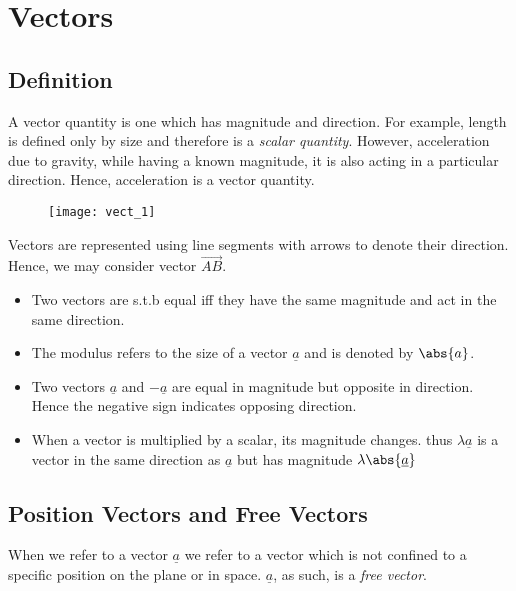 \documentclass{standalone}
\begin{document}
	\chapter{Vectors}
	\section{Definition}
	\quad A vector quantity is one which has magnitude and direction. For example, length is defined only by size and therefore is a \textit{scalar quantity}. However, acceleration due to gravity, while having a known magnitude, it is also acting in a particular direction. Hence, acceleration is a vector quantity.
	
	\begin{wrapfigure}{r}{0.25\textwidth}
		\texttt{[image: vect\_1]} 
	\end{wrapfigure}
	
	Vectors are represented using line segments with arrows to denote their direction. Hence, we may consider vector $\overrightarrow{AB}$.
	
	\begin{itemize}
		\item{Two vectors are s.t.b equal iff they have the same magnitude and act in the same direction.}
		\item{The modulus refers to the size of a vector $\underline{a}$ and is denoted by $\abs{a}$.}
		\item{Two vectors $\underline{a}$ and  $-\underline{a}$  are equal in magnitude but opposite in direction. Hence the negative sign indicates opposing direction.}
		\item{When a vector is multiplied by a scalar, its magnitude changes. thus $\lambda  \underline{a}$ is a vector in the same direction as  $\underline{a}$ but has magnitude $\lambda\abs{\underline{a}}$}
	\end{itemize}
	\section{Position Vectors and Free Vectors}
	\quad When we refer to a vector  $\underline{a}$ we refer to a vector which is not confined to a specific position on the plane or in space.  $\underline{a}$, as such, is a \textit{free vector}.\\
	
\end{document}
